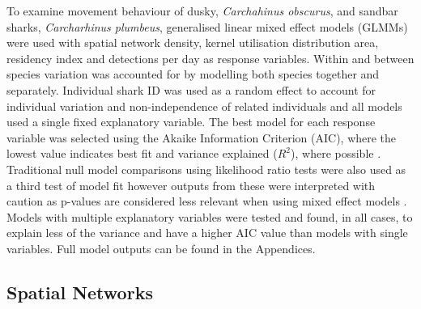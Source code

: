 \documentclass[11pt,a4paper]{article}
\begin{document}
	To examine movement behaviour of dusky, \textit{Carchahinus obscurus}, and sandbar sharks, \textit{Carcharhinus plumbeus}, generalised linear mixed effect models (GLMMs) were used with spatial network density, kernel utilisation distribution area, residency index and detections per day as response variables. Within and between species variation was accounted for by modelling both species together and separately. Individual shark ID was used as a random effect to account for individual variation and non-independence of related individuals and all models used a single fixed explanatory variable. The best model for each response variable was selected using the Akaike Information Criterion (AIC), where the lowest value indicates best fit \citep{Bolker2009} and variance explained ($R^2$), where possible \citep{Nakagawa2013}. Traditional null model comparisons using likelihood ratio tests were also used as a third test of model fit however outputs from these were interpreted with caution as p-values are considered less relevant when using mixed effect models \citep{Posada2004}. Models with multiple explanatory variables were tested and found, in all cases, to explain less of the variance and have a higher AIC value than models with single variables. Full model outputs can be found in the Appendices. 
	
	
	\subsection{Spatial Networks}
	
\end{document}
